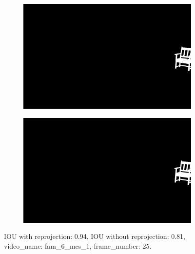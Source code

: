 \begin{figure}
\begin{subfigure}[t]{0.19\textwidth}
\end{subfigure}
\begin{subfigure}[t]{0.19\textwidth}
\centering
\includegraphics[scale=0.07]{good_examples/visual_99358_w_np.png}
\end{subfigure}
\begin{subfigure}[t]{0.19\textwidth}
\centering
\includegraphics[scale=0.07]{good_examples/visual_99358_wo_np.png}
\end{subfigure}
\caption{IOU with reprojection: 0.94, IOU without reprojection: 0.81, video\_name: fam\_6\_mcs\_1, frame\_number: 25.}
\end{figure}

